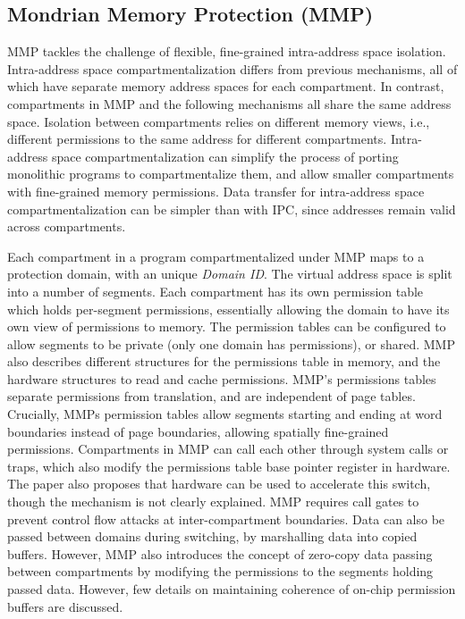 \subsection{Mondrian Memory Protection (MMP)}
MMP tackles the challenge of flexible, fine-grained intra-address space 
isolation.
Intra-address space compartmentalization differs from previous mechanisms,
all of which have separate memory address spaces for each compartment.
In contrast, compartments in MMP and the following mechanisms all share the
same address space.
Isolation between compartments relies on different 
memory views, i.e., different permissions to the same address for 
different compartments.
Intra-address space compartmentalization can simplify the process of
porting monolithic programs to compartmentalize them, and allow
smaller compartments with fine-grained memory permissions.
Data transfer for intra-address space compartmentalization can be simpler
than with IPC, since addresses remain valid across compartments.

Each compartment in a program compartmentalized under MMP maps to a protection
domain, with an unique \emph{Domain ID}.
The virtual address space is split into a number of segments.
Each compartment has its own permission table which holds per-segment permissions,
essentially allowing the domain to have its own view of permissions to memory.
The permission tables can be configured to allow segments to be private (only one 
domain has permissions), or shared.
MMP also describes different structures for the permissions table in memory, and
the hardware structures to read and cache permissions.
MMP's permissions tables separate permissions from translation, and are
independent of page tables.
Crucially, MMPs permission tables allow segments starting and ending at
word boundaries instead of page boundaries, allowing spatially fine-grained
permissions.
Compartments in MMP can call each other through system calls or traps, 
which also modify the permissions table base pointer register in hardware.
The paper also proposes that hardware can be used to accelerate this switch,
though the mechanism is not clearly explained.
MMP requires call gates to prevent control flow attacks at inter-compartment
boundaries.
Data can also be passed between domains during switching, by marshalling
data into copied buffers.
However, MMP also introduces the concept of zero-copy data passing between
compartments by modifying the permissions to the segments holding passed data.
However, few details on maintaining coherence of on-chip permission buffers 
are discussed.

